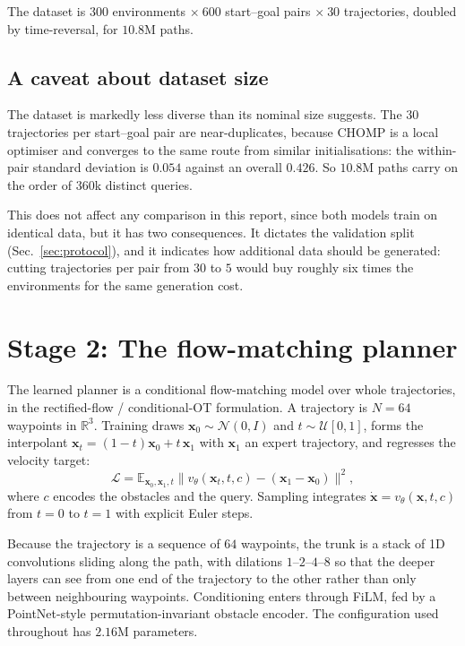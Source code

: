 \documentclass[11pt,a4paper]{article}
\begin{document}
The dataset is $300$ environments $\times\ 600$ start--goal pairs $\times\ 30$
trajectories, doubled by time-reversal, for $10.8$M paths.

\subsection{A caveat about dataset size}
\label{sec:diversity}

The dataset is markedly less diverse than its nominal size suggests. The $30$
trajectories per start--goal pair are near-duplicates, because CHOMP is a local
optimiser and converges to the same route from similar initialisations: the
within-pair standard deviation is $0.054$ against an overall $0.426$. So $10.8$M
paths carry on the order of $360$k distinct queries.

This does not affect any comparison in this report, since both models train on
identical data, but it has two consequences. It dictates the validation split
(Sec.~\ref{sec:protocol}), and it indicates how additional data should be
generated: cutting trajectories per pair from $30$ to $5$ would buy roughly six
times the environments for the same generation cost.

\section{Stage 2: The flow-matching planner}
\label{sec:planner}

The learned planner is a conditional flow-matching model over whole
trajectories, in the rectified-flow / conditional-OT formulation. A trajectory is
$N=64$ waypoints in $\mathbb{R}^3$. Training draws $\mathbf{x}_0 \sim
\mathcal{N}(0, I)$ and $t \sim \mathcal{U}[0,1]$, forms the interpolant
$\mathbf{x}_t = (1-t)\mathbf{x}_0 + t\,\mathbf{x}_1$ with $\mathbf{x}_1$ an
expert trajectory, and regresses the velocity target:
\begin{equation}
  \mathcal{L} = \mathbb{E}_{\mathbf{x}_0, \mathbf{x}_1, t}
  \bigl\| v_\theta(\mathbf{x}_t, t, c) - (\mathbf{x}_1 - \mathbf{x}_0) \bigr\|^2 ,
  \label{eq:cfm}
\end{equation}
where $c$ encodes the obstacles and the query. Sampling integrates
$\dot{\mathbf{x}} = v_\theta(\mathbf{x}, t, c)$ from $t=0$ to $t=1$ with explicit
Euler steps.

Because the trajectory is a sequence of $64$ waypoints, the trunk is a stack of
1D convolutions sliding along the path, with dilations $1$--$2$--$4$--$8$ so that
the deeper layers can see from one end of the trajectory to the other rather than
only between neighbouring waypoints. Conditioning enters through FiLM, fed by a
PointNet-style permutation-invariant obstacle encoder. The configuration used
throughout has $2.16$M parameters.
\end{document}
